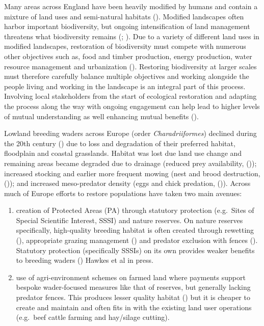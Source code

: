 \documentclass[
  12pt,
  letterpaper,
  DIV=11,
  numbers=noendperiod]{scrartcl}
\begin{document}
Many areas across England have been heavily modified by humans and
contain a mixture of land uses and semi-natural habitats
(). Modified landscapes often
harbor important biodiversity, but ongoing intensification of land
management threatens what biodiversity remains
(;
). Due to a
variety of different land uses in modified landscapes, restoration of
biodiversity must compete with numerous other objectives such as, food
and timber production, energy production, water resource management and
urbanization ().
Restoring biodiversity at larger scales must therefore carefully balance
multiple objectives and working alongside the people living and working
in the landscape is an integral part of this process. Involving local
stakeholders from the start of ecological restoration and adapting the
process along the way with ongoing engagement can help lead to higher
levels of mutual understanding as well enhancing mutual benefits
().

Lowland breeding waders across Europe (order \emph{Charadriiformes})
declined during the 20th century
() due
to loss and degradation of their preferred habitat, floodplain and
coastal grasslands. Habitat was lost due land use change and remaining
areas became degraded due to drainage (reduced prey availability,
()); increased
stocking and earlier more frequent mowing (nest and brood destruction,
()); and
increased meso-predator density (eggs and chick predation,
()). Across much of Europe
efforts to restore populations have taken two main avenues:

\begin{enumerate}
\def\labelenumi{\arabic{enumi}.}
\item
  creation of Protected Areas (PA) through statutory protection
  (e.g.~Sites of Special Scientific Interest, SSSI) and nature reserves.
  On nature reserves specifically, high-quality breeding habitat is
  often created through rewetting
  (), appropriate
  grazing management ()
  and predator exclusion with fences (). Statutory protection (specifically SSSIs) on its own
  provides weaker benefits to breeding waders
  () Hawkes et al in press.
\item
  use of agri-environment schemes on farmed land where payments support
  bespoke wader-focused measures like that of reserves, but generally
  lacking predator fences. This produces lesser quality habitat
  () but it is cheaper to
  create and maintain and often fits in with the existing land user
  operations (e.g.~beef cattle farming and hay/silage cutting).
\end{enumerate}
\end{document}

